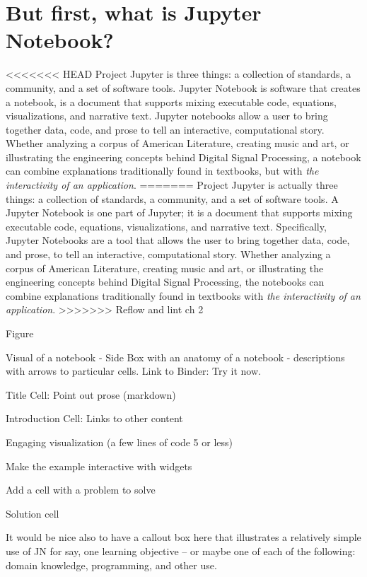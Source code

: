 \documentclass[]{book}
\begin{document}
\section{But first, what is Jupyter
Notebook?}\label{but-first-what-is-jupyter-notebook}

\textless{}\textless{}\textless{}\textless{}\textless{}\textless{}\textless{}
HEAD Project Jupyter is three things: a collection of standards, a
community, and a set of software tools. Jupyter Notebook is software
that creates a notebook, is a document that supports mixing executable
code, equations, visualizations, and narrative text. Jupyter notebooks
allow a user to bring together data, code, and prose to tell an
interactive, computational story. Whether analyzing a corpus of American
Literature, creating music and art, or illustrating the engineering
concepts behind Digital Signal Processing, a notebook can combine
explanations traditionally found in textbooks, but with \emph{the
interactivity of an application}. ======= Project Jupyter is actually
three things: a collection of standards, a community, and a set of
software tools. A Jupyter Notebook is one part of Jupyter; it is a
document that supports mixing executable code, equations,
visualizations, and narrative text. Specifically, Jupyter Notebooks are
a tool that allows the user to bring together data, code, and prose, to
tell an interactive, computational story. Whether analyzing a corpus of
American Literature, creating music and art, or illustrating the
engineering concepts behind Digital Signal Processing, the notebooks can
combine explanations traditionally found in textbooks with \emph{the
interactivity of an application}.
\textgreater{}\textgreater{}\textgreater{}\textgreater{}\textgreater{}\textgreater{}\textgreater{}
Reflow and lint ch 2

Figure

Visual of a notebook - Side Box with an anatomy of a notebook -
descriptions with arrows to particular cells. Link to Binder: Try it
now.

Title Cell: Point out prose (markdown)

Introduction Cell: Links to other content

Engaging visualization (a few lines of code 5 or less)

Make the example interactive with widgets

Add a cell with a problem to solve

Solution cell

It would be nice also to have a callout box here that illustrates a
relatively simple use of JN for say, one learning objective -- or maybe
one of each of the following: domain knowledge, programming, and other
use.
\end{document}
